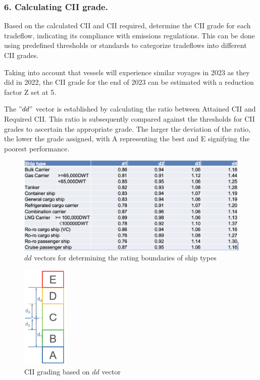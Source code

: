 \newpage
\subsubsection{6. Calculating CII grade.}

Based on the calculated CII and CII required, determine the CII grade for each tradeflow, indicating its compliance with emissions regulations.
This can be done using predefined thresholds or standards to categorize tradeflows into different CII grades.

Taking into account that vessels will experience similar voyages in 2023 as they did in 2022, the CII grade for the end of 2023 can be estimated with a reduction factor Z set at 5.

The $"dd"$ vector is established by calculating the ratio between Attained CII and Required CII.
This ratio is subsequently compared against the thresholds for CII grades to ascertain the appropriate grade.
The larger the deviation of the ratio, the lower the grade assigned, with A representing the best and E signifying the poorest performance.


\begin{figure}[h]
    \centering
    \includegraphics[width=1\textwidth]{images/dd_vecotor.png}
    \caption{$dd$ vectors for determining the rating boundaries of ship types}
    \label{dd_vecotor}
\end{figure}

\begin{figure}[h]
    \centering
    \includegraphics[width=0.2\textwidth]{images/cii_grade_dd_grade.png}
    \caption{CII grading based on $dd$ vector}
    \label{cii_grade_dd_grade}
\end{figure}

